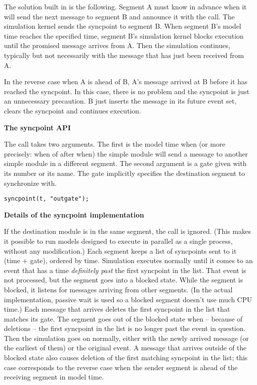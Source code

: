 The solution built in {\opp} is the following. Segment A must know in
advance when it will send the next message to segment B and announce
it with the  call. The simulation kernel sends the
syncpoint to segment B. When segment B's model time reaches the
specified time, segment B's simulation kernel blocks execution until
the promised message arrives from A. Then the simulation continues,
typically but not necessarily with the message that has just been
received from A.

In the reverse case when A is ahead of B, A's message arrived at B
before it has reached the syncpoint. In this case, there is no problem
and the syncpoint is just an unnecessary precaution. B just inserts
the message in its future event set, clears the syncpoint and
continues execution.


\textbf{The syncpoint API}


The  call takes two arguments. The first is the
model time when (or more precisely: when of after when) the simple
module will send a message to another simple module in a different
segment. The second argument is a gate given with its number or its
name. The gate implicitly specifies the destination segment to
synchronize with.

\begin{verbatim}
syncpoint(t, "outgate");
\end{verbatim}


\textbf{Details of the syncpoint implementation}


If the destination module is in the same segment, the call is ignored.
(This makes it possible to run models designed to execute in parallel
as a single process, without any modification.) Each segment keeps a
list of syncpoints sent to it (time + gate), ordered by time.
Simulation executes normally until it comes to an event that has a
time \textit{definitely past} the first syncpoint in the list. That
event is not processed, but the segment goes into a blocked state.
While the segment is blocked, it listens for messages arriving from
other segments. (In the actual implementation, passive wait is used so
a blocked segment doesn't use much CPU time.) Each message that
arrives deletes the first syncpoint in the list that matches its gate.
The segment goes out of the blocked state when -- because of deletions
-- the first syncpoint in the list is no longer past the event in
question. Then the simulation goes on normally, either with the newly
arrived message (or the earliest of them) or the original event. A
message that arrives outside of the blocked state also causes deletion
of the first matching syncpoint in the list; this case corresponds to
the reverse case when the sender segment is ahead of the receiving
segment in model time.


